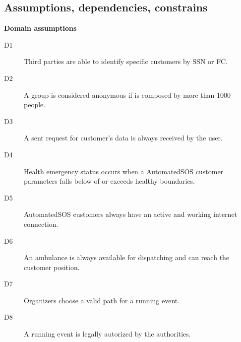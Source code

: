 \documentclass[../main.tex]{subfiles}
\begin{document}
\subsection{Assumptions, dependencies, constrains}

{\bf Domain assumptions}

\begin{description}

	\item [D1] Third parties are able to identify specific customers by SSN or FC.
	\item [D2] A group is considered anonymous if is composed by more than 1000 people.
	\item [D3] A sent request for customer's data is always received by the user.
	\item [D4] Health emergency status occurs when a AutomatedSOS customer parameters falls below of or exceeds healthy boundaries.
	\item [D5] AutomatedSOS customers always have an active and working internet connection.
	\item [D6] An ambulance is always available for dispatching and can reach the customer position.
	\item [D7] Organizers choose a valid path for a running event.
	\item [D8] A running event is legally autorized by the authorities.

\end{description}
\end{document}
